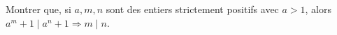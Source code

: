 Montrer que, si $a, m, n$ sont des entiers strictement positifs avec $a > 1$, alors $a^m + 1 \mid a^n + 1 \Rightarrow m \mid n$.
